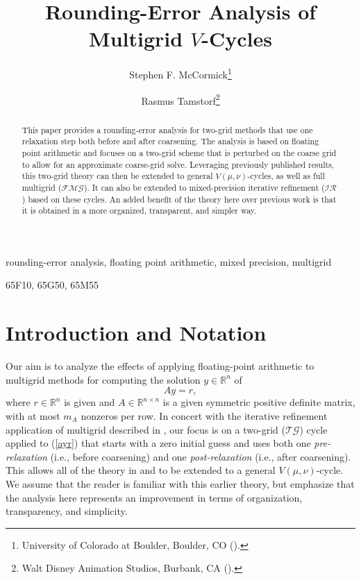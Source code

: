 \documentclass[onefignum,onetabnum]{siamart220329}
\title{Rounding-Error Analysis of Multigrid $V$-Cycles}
\author{Stephen F. McCormick\thanks{University of Colorado at Boulder, Boulder, CO
  (\email{stephen.mccormick@colorado.edu}).}
\and Rasmus Tamstorf\thanks{Walt Disney Animation Studios, Burbank, CA
  (\email{rt@acm.org}).}
}
\renewcommand{\Re}{\mathbb{R}}
\newcommand{\tg}{$\mathcal{TG}$}
\newcommand{\ir}{$\mathcal{IR}$}
\newcommand{\fmg}{$\mathcal{FMG}$}
\begin{document}
\maketitle


\begin{abstract}
  This paper provides a rounding-error analysis for two-grid methods that use one relaxation step both before and after coarsening. The analysis is based on floating point arithmetic and focuses on a two-grid scheme that is perturbed on the coarse grid to allow for an approximate coarse-grid solve. Leveraging previously published results, this two-grid theory can then be extended to general $V(\mu,\nu)$-cycles, as well as full multigrid ({\fmg}). It can also be extended to mixed-precision iterative refinement ({\ir}) based on these cycles. An added benefit of the theory here over previous work is that it is obtained in a more organized, transparent, and simpler way.
\end{abstract}

    \begin{keywords}
        rounding-error analysis, floating point arithmetic, mixed precision, multigrid
    \end{keywords}

\begin{AMS}
%
%
%
  65F10, 65G50, 65M55
\end{AMS}
    

\section{Introduction and Notation}

Our aim is to analyze the effects of applying floating-point arithmetic to multigrid methods for computing the solution $y \in \Re^n$ of
\begin{equation}
Ay = r, 
\label{ayr}
\end{equation}
where $r \in \Re^n$ is given and $A \in \Re^{n \times n}$ is a given symmetric positive definite matrix, with at most $m_A$ nonzeros per row. In concert with the iterative refinement application of multigrid described in \cite{McCormick2021}, our focus is on a two-grid ({\tg }) cycle applied to (\ref{ayr}) that starts with a zero initial guess and uses both one {\em pre-relaxation} (i.e., before coarsening) and one {\em post-relaxation} (i.e., after coarsening). This allows all of the theory in \cite{McCormick2021} and \cite{Tamstorf2021} to be extended to a general $V(\mu, \nu)$-cycle. We assume that the reader is familiar with this earlier theory, but emphasize that the analysis here represents an improvement in terms of organization, transparency, and simplicity.
\end{document}
